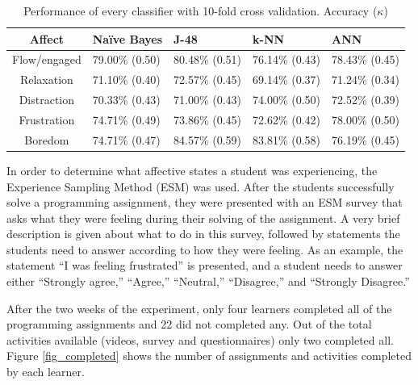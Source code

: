 \documentclass[a4paper,twoside]{article}
\begin{document}
\begin{table}[!t]
\centering
\caption{Performance of every classifier with 10-fold cross validation. Accuracy ($\kappa$) }
\label{tab_performance}
    \begin{tabular}{ | c | l | l | l | l | }
    \hline
    Affect          & Na\"ive Bayes           & J-48                & k-NN              & ANN \\
    \hline
    Flow/engaged    & 79.00\% (0.50) & 80.48\% (0.51) & 76.14\% (0.43) & 78.43\% (0.45) \\
    \hline
    Relaxation      & 71.10\% (0.40) & 72.57\% (0.45) & 69.14\% (0.37) & 71.24\% (0.34)\\
    \hline
    Distraction     & 70.33\% (0.43) & 71.00\% (0.43) & 74.00\% (0.50) & 72.52\% (0.39)\\
    \hline
    Frustration     & 74.71\% (0.49) & 73.86\% (0.45) & 72.62\% (0.42) & 78.00\% (0.50)\\
    \hline
    Boredom         & 74.71\% (0.47) & 84.57\% (0.59) & 83.81\% (0.58) & 76.19\% (0.45)\\
    \hline
    \end{tabular}
\end{table}



In order to determine what affective states a student was experiencing, the
Experience Sampling Method (ESM) \cite{kubey1996experience} was used.
After the students successfully solve a programming assignment, they were presented
with an ESM survey that asks what they were feeling during their solving of the
assignment. A very brief description is given about what to do in this survey,
followed by statements the students need to answer according to how they were
feeling. As an example, the statement “I was feeling frustrated” is presented,
and a student needs to answer either “Strongly agree,” “Agree,” “Neutral,”
“Disagree,” and “Strongly Disagree.”

After the two weeks of the experiment, only four learners completed all of the
programming assignments and 22 did not completed any. Out of the total activities
available (videos, survey and questionnaires) only two completed all. Figure \ref{fig_completed}
shows the number of assignments and activities completed by each learner.
\end{document}
